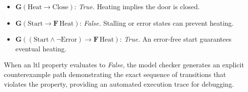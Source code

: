 \begin{itemize}
    \item $\mathbf{G}(\text{Heat} \rightarrow \text{Close})$: \textit{True.} Heating implies the door is closed.
    \item $\mathbf{G}(\text{Start} \rightarrow \mathbf{F} \, \text{Heat})$: \textit{False.} Stalling or error states can prevent heating.
    \item $\mathbf{G}((\text{Start} \land \neg\text{Error}) \rightarrow \mathbf{F} \, \text{Heat})$: \textit{True.} An error-free start guarantees eventual heating.
\end{itemize}

When an \gls{ltl} property evaluates to \textit{False}, the model checker generates an explicit counterexample path demonstrating the exact sequence of transitions that violates the property, providing an automated execution trace for debugging.